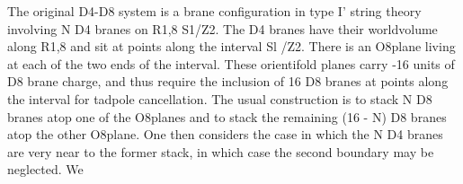 \documentclass{article}
\begin{document}
The original D4-D8 system is a brane configuration in type I' string theory involving N D4
branes on R1,8  S1/Z2. The D4 branes have their worldvolume along R1,8 and sit at points
along the interval Sl /Z2. There is an O8plane living at each of the two ends of the interval.
These orientifold planes carry -16 units of D8 brane charge, and thus require the inclusion
of 16 D8 branes at points along the interval for tadpole cancellation. The usual construction
is to stack N D8 branes atop one of the O8planes and to stack the remaining (16 - N)
D8 branes atop the other O8plane. One then considers the case in which the N D4 branes
are very near to the former stack, in which case the second boundary may be neglected. We

\end{document}
